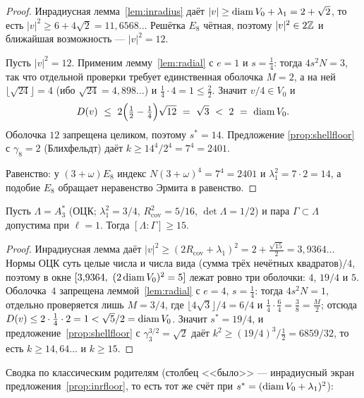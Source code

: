 \begin{proof}
Инрадиусная лемма~\ref{lem:inradius} даёт
$|v|\ge\operatorname{diam} V_0+\lambda_1=2+\sqrt2$, то есть $|v|^2\ge6+4\sqrt2=11{,}6568\ldots$
Решётка $E_8$ чётная, поэтому $|v|^2\in2\mathbb{Z}$ и ближайшая возможность ---
$|v|^2=12$.

Пусть $|v|^2=12$. Применим лемму~\ref{lem:radial} с $e=1$ и $s=\tfrac14$: тогда
$4s^2N=3$, так что отдельной проверки требует единственная оболочка $M=2$, а на
ней $\lfloor\sqrt{24}\rfloor=4$ (ибо $\sqrt{24}=4{,}898\ldots$) и
$\tfrac14\cdot4=1\le\tfrac22$. Значит $v/4\in V_0$ и
\[
D(v)\ \le\ 2\Bigl(\tfrac12-\tfrac14\Bigr)\sqrt{12}\ =\ \sqrt3\ <\ 2\ =\ \diam V_0 .
\]
Оболочка $12$ запрещена целиком, поэтому $s^{\ast}=14$. Предложение
\ref{prop:shellfloor} с $\gamma_8=2$ (Блихфельдт) даёт
$k\ge14^4/2^4=7^4=2401$.

Равенство: у $(3+\omega)E_8$ индекс $N(3+\omega)^4=7^4=2401$ и
$\lambda_1^2=7\cdot2=14$, а подобие $E_8$ обращает неравенство Эрмита в
равенство.
\end{proof}

\begin{theorem}\label{thm:a3opt}
\stP{} Пусть $\Lambda=A_3^{*}$ (ОЦК; $\lambda_1^2=3/4$,
$R_{\mathrm{cov}}^2=5/16$, $\det\Lambda=1/2$) и пара $\Gamma\subset\Lambda$
допустима при $\ell=1$. Тогда $[\Lambda:\Gamma]\ge15$.
\end{theorem}

\begin{proof}
Инрадиусная лемма даёт $|v|^2\ge(2R_{\mathrm{cov}}+\lambda_1)^2=
2+\tfrac{\sqrt{15}}2=3{,}9364\ldots$ Нормы ОЦК суть целые числа и числа вида
(сумма трёх нечётных квадратов)$/4$, поэтому в окне
$[3{,}9364,\ (2\operatorname{diam} V_0)^2=5]$ лежат ровно три оболочки: $4$, $19/4$ и $5$.
Оболочка~$4$ запрещена леммой~\ref{lem:radial} с $e=4$, $s=\tfrac14$: тогда
$4s^2N=1$, отдельно проверяется лишь $M=3/4$, где
$\lfloor4\sqrt3\rfloor/4=6/4$ и $\tfrac14\cdot\tfrac64=\tfrac38=\tfrac M2$;
отсюда $D(v)\le2\cdot\tfrac14\cdot2=1<\sqrt{5}/2=\operatorname{diam} V_0$. Значит
$s^{\ast}=19/4$, и предложение~\ref{prop:shellfloor} с
$\gamma_3^{3/2}=\sqrt2$ даёт $k^2\ge(19/4)^3/\tfrac12=6859/32$, то есть
$k\ge14{,}64\ldots$ и $k\ge15$.
\end{proof}

Сводка по классическим родителям (столбец <<было>> --- инрадиусный экран
предложения~\ref{prop:inrfloor}, то есть тот же счёт при
$s^{\ast}=(\operatorname{diam} V_0+\lambda_1)^2$):

